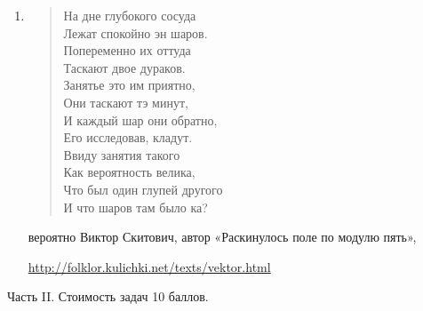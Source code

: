 \documentclass[12pt, a4paper]{article}\usepackage[]{graphicx}\usepackage[]{color}
\begin{document}
\begin{enumerate}
		\item
		\begin{flushleft}
			\begin{verse}
				На дне глубокого сосуда \\
				Лежат спокойно эн шаров. \\
				Попеременно их оттуда \\
				Таскают двое дураков. \\
				Занятье это им приятно, \\
				Они таскают тэ минут, \\
				И каждый шар они обратно, \\
				Его исследовав, кладут. \\
				Ввиду занятия такого \\
				Как вероятность велика, \\
				Что был один глупей другого \\
				И что шаров там было ка?
			\end{verse}
		\end{flushleft}
		вероятно Виктор Скитович, автор «Раскинулось поле по модулю пять»,

		\url{http://folklor.kulichki.net/texts/vektor.html}

	\end{enumerate}

	Часть II. Стоимость задач 10 баллов.
\end{document}

